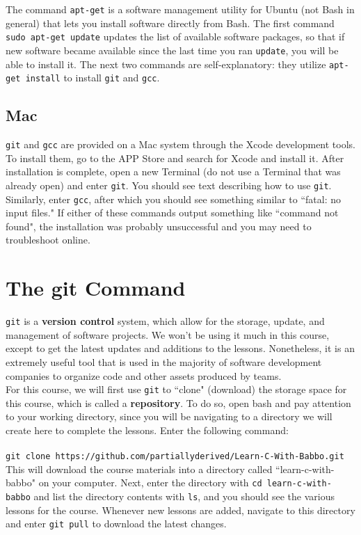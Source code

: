 \documentclass{article}
\begin{document}
The command \verb|apt-get| is a software management utility for Ubuntu 
(not Bash in general) that lets you install software directly from Bash. The first command \verb|sudo apt-get update|
updates the list of available software packages, so that if new software became available since the last time you ran
\verb|update|, you will be able to install it. The next two commands are self-explanatory: they utilize
\verb|apt-get install| to install \verb|git| and \verb|gcc|.
\subsection*{Mac}
\verb|git| and \verb|gcc| are provided on a Mac system through the Xcode development tools. To install them, go to the 
APP Store and search for Xcode and install it. After installation is complete, open a new Terminal (do not use a 
Terminal that was already open) and enter \verb|git|. You should see text describing how to use \verb|git|. Similarly,
enter \verb|gcc|, after which you should see something similar to ``fatal: no input files." If either of these commands
output something like ``command not found", the installation was probably unsuccessful and you may need to 
troubleshoot online.

\section*{The git Command}
\verb|git| is a \textbf{version control} system, which allow for the storage, update, and management of software 
projects. We won't be using it much in this course, except to get the latest updates and additions to the lessons. 
Nonetheless, it is an extremely useful tool that is used in the majority of software development companies to organize
code and other assets produced by teams. \\ 

For this course, we will first use \verb|git| to ``clone" (download) the storage space for this course, which is called
a \textbf{repository}. To do so, open bash and pay attention to your working directory, since you will be navigating to
a directory we will create here to complete the lessons. Enter the following command: \\ \\
\verb|git clone https://github.com/partiallyderived/Learn-C-With-Babbo.git| \\
This will download the course materials into a directory called ``learn-c-with-babbo" on your computer. Next, enter the
directory with \verb|cd learn-c-with-babbo| and list the directory contents with \verb|ls|, and you should see the
various lessons for the course. Whenever new lessons are added, navigate to this directory and enter
\verb|git pull| to download the latest changes. \\
\end{document}
